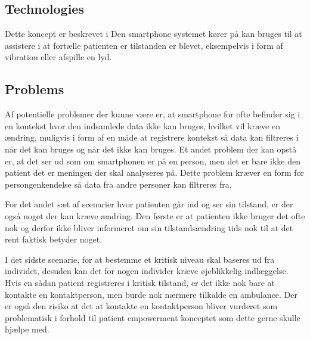 \subsection{Technologies}
Dette koncept er beskrevet i \citep[Afsnit 13.3, s83, nederst]{art:essence}
Den smartphone systemet kører på kan bruges til at assistere i at fortælle patienten er tilstanden er blevet, eksempelvis i form af vibration eller afspille en lyd.

\subsection{Problems}
Af potentielle problemer der kunne være er, at smartphone for ofte befinder sig i en kontekst hvor den indsamlede data ikke kan bruges, hvilket vil kræve en ændring, muligvis i form af en måde at registrere kontekst så data kan filtreres i når det kan bruges og når det ikke kan bruges.
Et andet problem der kan opstå er, at det ser ud som om smartphonen er på en person, men det er bare ikke den patient det er meningen der skal analyseres på.
Dette problem kræver en form for persongenkendelse så data fra andre personer kan filtreres fra.

For det andet sæt af scenarier hvor patienten går ind og ser sin tilstand, er der også noget der kan kræve ændring.
Den første er at patienten ikke bruger det ofte nok og derfor ikke bliver informeret om sin tilstandsændring tids nok til at det rent faktisk betyder noget.

I det sidste scenarie, for at bestemme et kritisk niveau skal baseres ud fra individet, desuden kan det for nogen individer kræve øjeblikkelig indlæggelse.
Hvis en sådan patient registreres i kritisk tilstand, er det ikke nok bare at kontakte en kontaktperson, men burde nok nærmere tilkalde en ambulance.
Der er også den risiko at det at kontakte en kontaktperson bliver vurderet som problematisk i forhold til patient empowerment konceptet som dette gerne skulle hjælpe med. 

